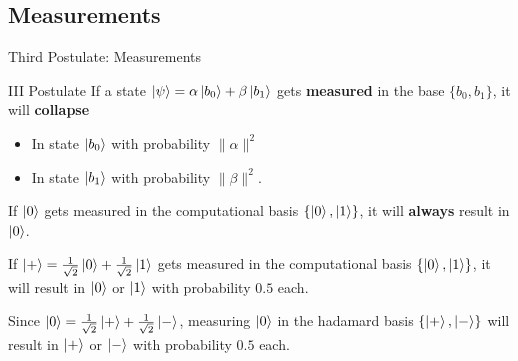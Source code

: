 \documentclass{beamer}
\newcommand{\calH}{\mathcal{H}}
\newcommand{\kp}{\ket{\psi}}
\newcommand{\kz}{\ket{0}}
\newcommand{\ko}{\ket{1}}
\newcommand{\kpl}{\ket{+}}
\newcommand{\km}{\ket{-}}
\newcommand{\oost}{\frac{1}{\sqrt{2}}}
\begin{document}

\subsection{Measurements}	
\begin{frame}{Third Postulate: Measurements}
\begin{block}{III Postulate}
	If a state $\kp = \alpha\ket{b_0} + \beta\ket{b_1}$ gets \textbf{measured} in the base $\{b_0, b_1\}$, 
	it will \textbf{collapse} \begin{itemize}
	 \item In state $\ket{b_0}$ with probability $\|\alpha\|^2$
	 \item In state $\ket{b_1}$ with probability $\|\beta\|^2$.
	\end{itemize}
\end{block}


\pause
If $\kz$ gets measured in the computational basis $\{\kz, \ko\}$, it will \textbf{always} result in $\kz$.


\pause\bigskip
If $\kpl = \oost\kz + \oost\ko$ gets measured in the computational basis $\{\kz, \ko\}$, it will result in $\kz$ or $\ko$ with probability $0.5$ each. 


\pause\bigskip
Since $\kz = \oost \kpl + \oost \km$, measuring $\kz$ in the hadamard basis $\{\kpl, \km\}$ will result in $\kpl$ or $\km$ with probability $0.5$ each. 
\end{frame}
\end{document}
